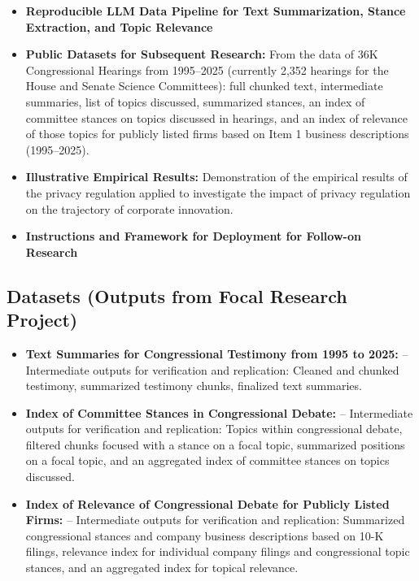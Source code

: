 \documentclass[11pt]{article}
\begin{document}
\begin{itemize}
    \item \textbf{Reproducible LLM Data Pipeline for Text Summarization, Stance Extraction, and Topic Relevance}
    \item \textbf{Public Datasets for Subsequent Research:} From the data of 36K Congressional Hearings from 1995--2025 (currently 2,352 hearings for the House and Senate Science Committees): full chunked text, intermediate summaries, list of topics discussed, summarized stances, an index of committee stances on topics discussed in hearings, and an index of relevance of those topics for publicly listed firms based on Item 1 business descriptions (1995--2025).
    \item \textbf{Illustrative Empirical Results:} Demonstration of the empirical results of the privacy regulation applied to investigate the impact of privacy regulation on the trajectory of corporate innovation.
    \item \textbf{Instructions and Framework for Deployment for Follow-on Research}
\end{itemize}

\subsection{Datasets (Outputs from Focal Research Project)}

\begin{itemize}
    \item \textbf{Text Summaries for Congressional Testimony from 1995 to 2025:} -- Intermediate outputs for verification and replication: Cleaned and chunked testimony, summarized testimony chunks, finalized text summaries.
    \item \textbf{Index of Committee Stances in Congressional Debate:} -- Intermediate outputs for verification and replication: Topics within congressional debate, filtered chunks focused with a stance on a focal topic, summarized positions on a focal topic, and an aggregated index of committee stances on topics discussed.
    \item \textbf{Index of Relevance of Congressional Debate for Publicly Listed Firms:} -- Intermediate outputs for verification and replication: Summarized congressional stances and company business descriptions based on 10-K filings, relevance index for individual company filings and congressional topic stances, and an aggregated index for topical relevance.
\end{itemize}
\end{document}
